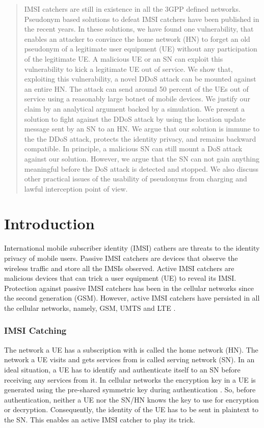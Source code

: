 \documentclass{llncs} %
\begin{document}
\begin{abstract}
IMSI catchers are still in existence in all the 3GPP defined networks. Pseudonym based solutions to defeat IMSI catchers have been published in the recent years. In these solutions, we have found one vulnerability, that enables an attacker to convince the home network (HN) to forget an old pseudonym of a legitimate user equipment (UE) without any participation of the legitimate UE. A malicious UE or an SN can exploit this vulnerability to kick a legitimate UE out of service. We show that, exploiting this vulnerability, a novel DDoS attack can be mounted against an entire HN. The attack can send around 50 percent of the UEs out of service using a reasonably large botnet of mobile devices. We justify our claim by an analytical argument backed by a simulation. We present a solution to fight against the DDoS attack by using the location update message sent by an SN to an HN. We argue that our solution is immune to the the DDoS attack, protects the identity privacy, and remains backward compatible. In principle, a malicious SN can still mount a DoS attack against our solution. However, we argue that the SN can not gain anything meaningful before the DoS attack is detected and stopped. We also discuss other practical issues of the usability of pseudonyms from charging and lawful interception point of view.
\end{abstract}


\section{Introduction} \label{intro}
International mobile subscriber identity (IMSI) cathers are threats to the identity privacy of mobile users. Passive IMSI catchers are devices that observe the wireless traffic and store all the IMSIs observed. Active IMSI catchers are malicious devices that can trick a user equipment (UE) to reveal its IMSI. Protection against passive IMSI catchers has been in the cellular networks since the second generation (GSM). However, active IMSI catchers have persisted in all the cellular networks, namely, GSM, UMTS and LTE \cite{mobicom95,imsi_catcher_report_bochum,Ginzboorg_Niemi_2016,washingtonpost2014,pets2017,pki_umts_imsi_catcher}. 

\subsubsection{IMSI Catching}
The network a UE has a subscription with is called the home network (HN). The network a UE visits and gets services from is called serving network (SN). In an ideal situation, a UE has to identify and authenticate itself to an SN before receiving any services from it. In cellular networks the encryption key in a UE is generated using the pre-shared symmetric key during authentication \cite{TS33401}. So, before authentication, neither a UE nor the SN/HN knows the key to use for encryption or decryption.  Consequently, the identity of the UE has to be sent in plaintext to the SN. This enables an active IMSI catcher to play its trick.
\end{document}
